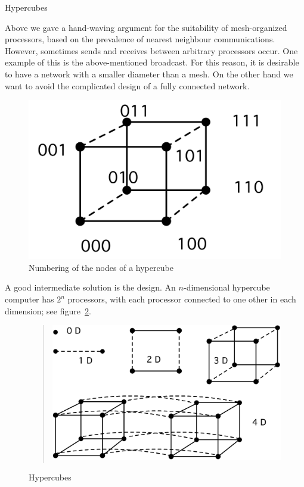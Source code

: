  {Hypercubes}
\label{sec:hypercube}

Above we gave a hand-waving argument for the suitability of
mesh-organized processors, based on the prevalence of nearest
neighbour communications. However, sometimes sends and receives
between arbitrary processors occur. One example of this is the
above-mentioned broadcast. For this reason, it is desirable to have a
network with a smaller diameter than a mesh. On the other hand we want
to avoid the complicated design of a fully connected network.

\begin{figure}
  \includegraphics[scale=.081]{graphics/hypercubenumber}
  \caption{Numbering of the nodes of a hypercube}
  \label{fig:cubenumber}
\end{figure}
%
A good intermediate solution is the  design. An
$n$-dimensional hypercube computer has $2^n$ processors, with each
processor connected to one other in each dimension; see
figure~\ref{fig:hypercube}. 

\begin{figure}[t]
  \begin{quote}
  \includegraphics[scale=.12]{graphics/hypercubes}
  \end{quote}
  \caption{Hypercubes}
  \label{fig:hypercube}
\end{figure}

